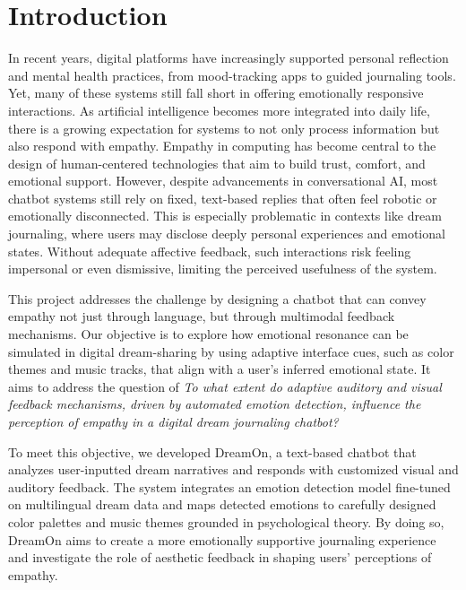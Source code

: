 \documentclass[conference]{IEEEtran}
\begin{document}
	\section{Introduction}
 	In recent years, digital platforms have increasingly supported personal reflection and mental health practices, from mood-tracking apps to guided journaling tools. Yet, many of these systems still fall short in offering emotionally responsive interactions. As artificial intelligence becomes more integrated into daily life, there is a growing expectation for systems to not only process information but also respond with empathy. Empathy in computing has become central to the design of human-centered technologies that aim to build trust, comfort, and emotional support. However, despite advancements in conversational AI, most chatbot systems still rely on fixed, text-based replies that often feel robotic or emotionally disconnected. This is especially problematic in contexts like dream journaling, where users may disclose deeply personal experiences and emotional states. Without adequate affective feedback, such interactions risk feeling impersonal or even dismissive, limiting the perceived usefulness of the system.

	This project addresses the challenge by designing a chatbot that can convey empathy not just through language, but through multimodal feedback mechanisms. Our objective is to explore how emotional resonance can be simulated in digital dream-sharing by using adaptive interface cues, such as color themes and music tracks, that align with a user's inferred emotional state. It aims to address the question of \textit{To what extent do adaptive auditory and visual feedback mechanisms, driven by automated emotion detection, influence the perception of empathy in a digital dream journaling chatbot?}
 
	To meet this objective, we developed DreamOn, a text-based chatbot that analyzes user-inputted dream narratives and responds with customized visual and auditory feedback. The system integrates an emotion detection model fine-tuned on multilingual dream data and maps detected emotions to carefully designed color palettes and music themes grounded in psychological theory. By doing so, DreamOn aims to create a more emotionally supportive journaling experience and investigate the role of aesthetic feedback in shaping users’ perceptions of empathy.
\end{document}
